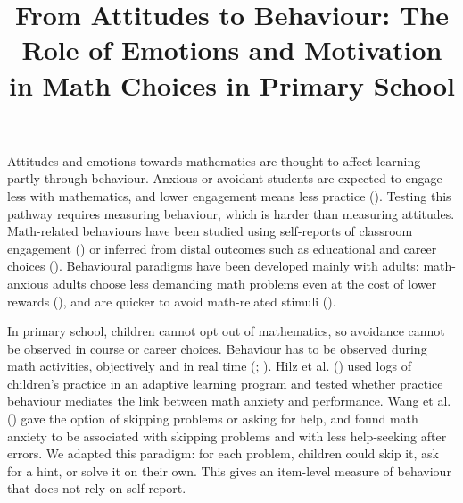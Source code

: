 \documentclass[
  man,
  floatsintext,
  longtable,
  nolmodern,
  notxfonts,
  notimes,
  colorlinks=true,linkcolor=blue,citecolor=blue,urlcolor=blue]{apa7}
\title{From Attitudes to Behaviour: The Role of Emotions and Motivation
in Math Choices in Primary School}
\begin{document}
\maketitle




\setlength\LTleft{0pt}




Attitudes and emotions towards mathematics are thought to affect
learning partly through behaviour. Anxious or avoidant students are
expected to engage less with mathematics, and lower engagement means
less practice (). Testing
this pathway requires measuring behaviour, which is harder than
measuring attitudes. Math-related behaviours have been studied using
self-reports of classroom engagement
() or inferred from
distal outcomes such as educational and career choices
(). Behavioural paradigms
have been developed mainly with adults: math-anxious adults choose less
demanding math problems even at the cost of lower rewards
(), and are quicker to avoid
math-related stimuli ().

In primary school, children cannot opt out of mathematics, so avoidance
cannot be observed in course or career choices. Behaviour has to be
observed during math activities, objectively and in real time
(;
). Hilz et al.
() used logs of children's practice in an
adaptive learning program and tested whether practice behaviour mediates
the link between math anxiety and performance. Wang et al.
() gave the option of skipping problems or
asking for help, and found math anxiety to be associated with skipping
problems and with less help-seeking after errors. We adapted this
paradigm: for each problem, children could skip it, ask for a hint, or
solve it on their own. This gives an item-level measure of behaviour
that does not rely on self-report.
\end{document}
